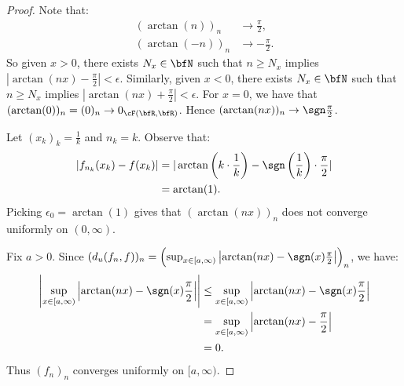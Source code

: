 \documentclass[10pt,twoside,openany]{memoir}
\begin{document}
        \begin{proof}
            Note that:
                \begin{equation*}
                \begin{split}
                    (\arctan(n))_n &\rightarrow \frac{\pi}{2}, \\
                    (\arctan(-n))_n &\rightarrow -\frac{\pi}{2}.
                \end{split}
                \end{equation*}
            So given $x > 0$, there exists $N_x \in \bfN$ such that $n \geq N_x$ implies $|\arctan(nx) - \frac{\pi}{2}| < \epsilon$. Similarly, given $x < 0$, there exists $N_x \in \bfN$ such that $n \geq N_x$ implies $|\arctan(nx) + \frac{\pi}{2}| < \epsilon$. For $x = 0$, we have that $(\arctan(0))_n = (0)_n \rightarrow 0_{\cF(\bfR,\bfR)}$. Hence $(\arctan(nx))_n \rightarrow \sgn \frac{\pi}{2}$.

            Let $(x_k)_k = \frac{1}{k}$ and $n_k = k$. Observe that:
                \begin{equation*}
                \begin{split}
                    |f_{n_k}(x_k) - f(x_k)|
                    & = |\arctan\left(k \cdot \frac{1}{k}\right) - \sgn\left(\frac{1}{k}\right)\cdot \frac{\pi}{2}| \\
                    & = \arctan(1).
                \end{split}
                \end{equation*}
            Picking $\epsilon_0 = \arctan(1)$ gives that $(\arctan(nx))_n$ does not converge uniformly on $(0,\infty)$.

            Fix $a > 0$. Since $(d_u(f_n,f))_n = \left(\sup_{x \in [a,\infty)}\left|\arctan(nx) - \sgn(x)\frac{\pi}{2}\right|\right)_n$, we have:
                \begin{equation*}
                \begin{split}
                    \left|\sup_{x \in [a,\infty)} \left|\arctan(nx) - \sgn(x)\frac{\pi}{2}\right|\right|
                    & \leq \sup_{x \in [a,\infty)} \left|\arctan(nx) - \sgn(x)\frac{\pi}{2} \right| \\
                    & = \sup_{x \in [a,\infty)}\left|\arctan(nx) - \frac{\pi}{2}\right| \\
                    & = 0.
                \end{split}
                \end{equation*}
            Thus $(f_n)_n$ converges uniformly on $[a,\infty)$.
        \end{proof}
\end{document}
